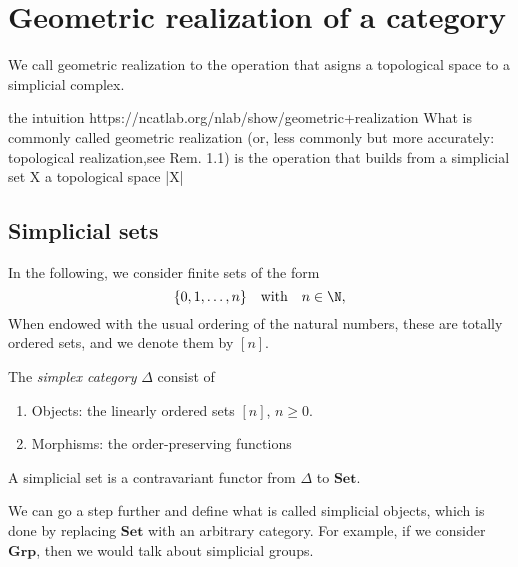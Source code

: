 \chapter{Geometric realization of a category}

We call geometric realization to the operation that asigns a topological space to a simplicial complex.

the intuition 
https://ncatlab.org/nlab/show/geometric+realization  What is commonly called geometric realization (or, less commonly but more accurately: topological realization,see Rem. 1.1) is the operation that builds from a simplicial set X a topological space |X|

\section{Simplicial sets}


In the following, we consider finite sets of the form \[\{0,1,\dots,n\}\quad\text{with}\quad n\in\N,\] 
When  endowed with the usual ordering of the natural numbers, these are totally ordered sets, and we denote them  by \([n]\). %


\begin{definition}
    The \textit{simplex category} \(\Delta\) consist of \begin{enumerate}[label=(\roman*)]
        \item Objects: the linearly ordered sets \([n]\), \(n\geq 0\).
        \item Morphisms: the order-preserving functions
    \end{enumerate}
\end{definition}


\begin{definition}
    A simplicial set is a contravariant functor from \(\Delta\) to \(\mathbf{Set}\).
    
\end{definition}


We can go a step further and define what is called simplicial objects, which is done by replacing \(\mathbf{Set}\) with an arbitrary category. 
For example, if we consider \(\mathbf{Grp}\), then we would talk about simplicial groups.

